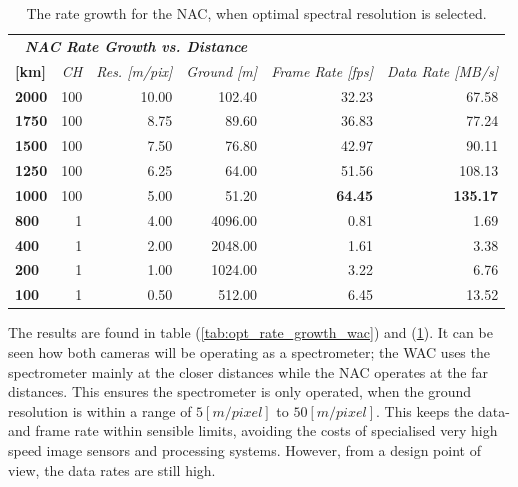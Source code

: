 \begin{table}[htb!]
  \centering
    \begin{tabular}{l|r|r|r|r|r|}
\multicolumn{4}{c|}{\textit{\textbf{NAC Rate Growth vs. Distance}}} & \multicolumn{1}{r}{} & \multicolumn{1}{r}{} \bigstrut[b]\\
\cline{1-4}\textbf{[km]} & \textit{CH} & \textit{Res. [m/pix]} & \multicolumn{1}{c|}{\textit{Ground [m]}} & \multicolumn{1}{c}{\textit{Frame Rate [fps]}} & \multicolumn{1}{r}{\textit{Data Rate [MB/s]}} \bigstrut\\
\hline
\textbf{2000} & 100   & 10.00 & 102.40 & 32.23 & 67.58 \bigstrut[t]\\
\textbf{1750} & 100   & 8.75  & 89.60 & 36.83 & 77.24 \\
\textbf{1500} & 100   & 7.50  & 76.80 & 42.97 & 90.11 \\
\textbf{1250} & 100   & 6.25  & 64.00 & 51.56 & 108.13 \\
\textbf{1000} & 100   & 5.00  & 51.20 & \textbf{64.45} & \textbf{135.17} \\
\textbf{800} & 1     & 4.00  & 4096.00 & 0.81  & 1.69 \\
\textbf{400} & 1     & 2.00  & 2048.00 & 1.61  & 3.38 \\
\textbf{200} & 1     & 1.00  & 1024.00 & 3.22  & 6.76 \\
\textbf{100} & 1     & 0.50  & 512.00 & 6.45  & 13.52 \\
\end{tabular}%
  \caption{The rate growth for the NAC, when optimal spectral resolution is selected.}
  \label{tab:opt_rate_growth_nac}%
\end{table}%
The results are found in table (\ref{tab:opt_rate_growth_wac}) and (\ref{tab:opt_rate_growth_nac}). It can be seen how both cameras will be operating as a spectrometer; the WAC uses the spectrometer mainly at the closer distances while the NAC operates at the far distances. This ensures the spectrometer is only operated, when the ground resolution is within a range of $5[m/pixel]$ to $50[m/pixel]$. This keeps the data- and frame rate within sensible limits, avoiding the costs of specialised very high speed image sensors and processing systems. However, from a design point of view, the data rates are still high. 

